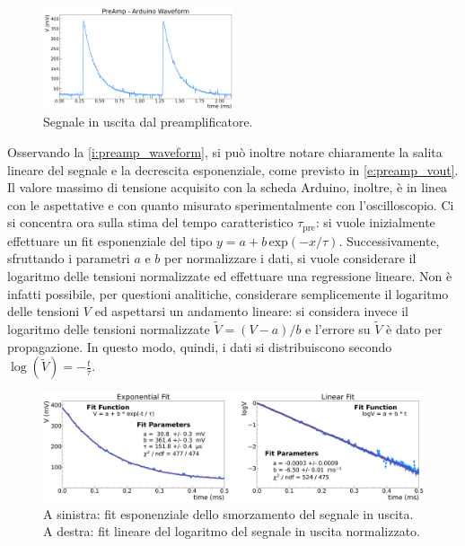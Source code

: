 \documentclass[a4paper,11pt]{article} %
\begin{document}
 \begin{figure}
 	\centering
 	\includegraphics[width=0.5\textwidth]{../Plots/PreAmp/preamp_waveform.png}
 	\caption{\small Segnale in uscita dal preamplificatore.}
 	\label{i:preamp_waveform}
 \end{figure}

Osservando la \autoref{i:preamp_waveform}, si può inoltre notare chiaramente la salita lineare del segnale e la
decrescita esponenziale, come previsto in \autoref{e:preamp_vout}. Il valore massimo di tensione acquisito con la scheda
Arduino, inoltre, è in linea con le aspettative e con quanto misurato sperimentalmente con l'oscilloscopio. Ci si
concentra ora sulla stima del tempo caratteristico $\tau_{\text{pre}}$: si vuole inizialmente effettuare un fit
esponenziale del tipo $y = a + b\,\text{exp}(-x/\tau)$. Successivamente, sfruttando i parametri $a$ e $b$ per
normalizzare i dati, si vuole considerare il logaritmo delle tensioni normalizzate ed effettuare una regressione
lineare. Non è infatti possibile, per questioni analitiche, considerare semplicemente il logaritmo delle tensioni $V$ ed
aspettarsi un andamento lineare: si considera invece il logaritmo delle tensioni normalizzate $\tilde{V} = (V-a)/b$ e
l'errore su $\tilde{V}$ è dato per propagazione. In questo modo, quindi, i dati si distribuiscono secondo
$\log(\tilde{V})= -\frac{t}{\tau}$. 
 
\begin{figure}[H]
	\centering
	\includegraphics[width=\linewidth]{../Plots/PreAmp/preamp_arduino_fit2.png}
	\caption{\small A sinistra: fit esponenziale dello smorzamento del segnale in uscita. 
					A destra: fit lineare del logaritmo del segnale in uscita normalizzato.}
	\label{i:preamp_arduino_fit}
\end{figure}
 
\end{document}
